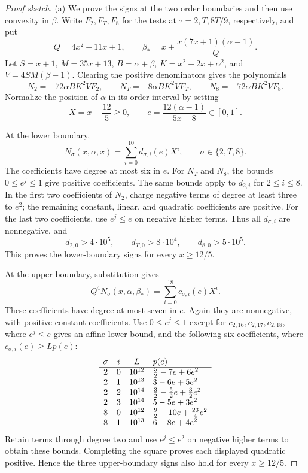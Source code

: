 \begin{proof}[Proof sketch]
(a) We prove the signs at the two order boundaries and then use convexity
in $\beta$. Write $F_2,F_T,F_8$ for the tests at $\tau=2,T,8T/9$,
respectively, and put
\[
 Q=4x^2+11x+1,\qquad
 \beta_*=x+\frac{x(7x+1)(\alpha-1)}Q.
\]
Let $S=x+1$, $M=35x+13$, $B=\alpha+\beta$,
$K=x^2+2x+\alpha^2$, and $V=4SM(\beta-1)$. Clearing the positive
denominators gives the polynomials
\[
 N_2=-72\alpha BK^2VF_2,\qquad
 N_T=-8\alpha BK^2VF_T,\qquad
 N_8=-72\alpha BK^2VF_8.
\]
Normalize the position of $\alpha$ in its order interval by setting
\[
 X=x-\frac{12}5\ge0,\qquad
 e=\frac{12(\alpha-1)}{5x-8}\in[0,1].
\]

At the lower boundary,
\[
 N_\sigma(x,\alpha,x)=\sum_{i=0}^{10}d_{\sigma,i}(e)X^i,
 \qquad \sigma\in\{2,T,8\}.
\]
The coefficients have degree at most six in $e$. For $N_T$ and $N_8$,
the bounds $0\le e^j\le1$ give positive coefficients. The same bounds
apply to $d_{2,i}$ for $2\le i\le8$. In the first two coefficients of
$N_2$, charge negative terms of degree at least three to $e^2$; the
remaining constant, linear, and quadratic coefficients are positive.
For the last two coefficients, use $e^j\le e$ on negative higher terms.
Thus all $d_{\sigma,i}$ are nonnegative, and
\[
 d_{2,0}>4\cdot10^5,\qquad
 d_{T,0}>8\cdot10^4,\qquad
 d_{8,0}>5\cdot10^5.
\]
This proves the lower-boundary signs for every $x\ge12/5$.

At the upper boundary, substitution gives
\[
 Q^4N_\sigma(x,\alpha,\beta_*)
   =\sum_{i=0}^{18}c_{\sigma,i}(e)X^i.
\]
These coefficients have degree at most seven in $e$. Again they are
nonnegative, with positive constant coefficients. Use $0\le e^j\le1$
except for $c_{2,16},c_{2,17},c_{2,18}$, where $e^j\le e$ gives an
affine lower bound, and the following six coefficients, where
$c_{\sigma,i}(e)\ge Lp(e)$:
\[
\begin{array}{c c c l}
 \sigma&i&L&p(e)\\\hline
 2&0&10^{12}&\frac52-7e+6e^2\\
 2&1&10^{13}&3-6e+5e^2\\
 2&2&10^{14}&\frac32-\frac52e+\frac32e^2\\
 2&3&10^{14}&5-5e+3e^2\\
 8&0&10^{12}&\frac92-10e+\frac{23}4e^2\\
 8&1&10^{13}&6-8e+4e^2
\end{array}
\]
Retain terms through degree two and use $e^j\le e^2$ on negative
higher terms to obtain these bounds. Completing the square proves each
displayed quadratic positive. Hence the three upper-boundary signs also
hold for every $x\ge12/5$.


\end{proof}
